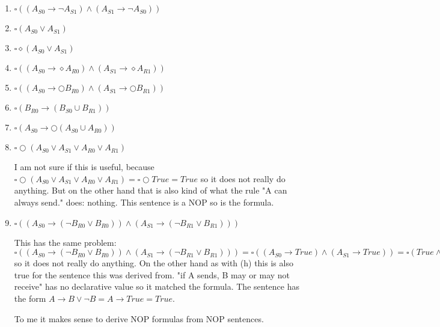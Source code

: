 \documentclass[12pt, a4paper]{article}
\begin{document}
\section{} %
\begin{enumerate}[a]
	\item %
	$\square ((A_{S0} \rightarrow \lnot A_{S1}) \land (A_{S1} \rightarrow \lnot A_{S0}))$
	\item %
	$\square (A_{S0} \lor A_{S1})$
	\item %
	$\square \diamond (A_{S0} \lor A_{S1})$
	\item %
	$\square ((A_{S0} \rightarrow \diamond A_{R0}) \land (A_{S1} \rightarrow \diamond A_{R1}))$
	\item %
	$\square ((A_{S0} \rightarrow \bigcirc B_{R0}) \land (A_{S1} \rightarrow \bigcirc B_{R1}))$
	\item %
	$\square (B_{R0} \rightarrow (B_{S0} \cup B_{R1}))$
	\item %
	$\square (A_{S0} \rightarrow \bigcirc (A_{S0} \cup A_{R0}))$
	\item %
	$\square \bigcirc (A_{S0} \lor A_{S1} \lor A_{R0} \lor A_{R1})$

	I am not sure if this is useful, because $\square \bigcirc (A_{S0} \lor A_{S1} \lor A_{R0} \lor A_{R1}) = \square \bigcirc True = True$ so it does not really do anything. But on the other hand that is also kind of what the rule "A can always send." does: nothing. This sentence is a NOP so is the formula.
	\item %
	$\square ((A_{S0} \rightarrow (\lnot B_{R0} \lor B_{R0})) \land (A_{S1} \rightarrow (\lnot B_{R1} \lor B_{R1})))$

	This has the same problem: $\square ((A_{S0} \rightarrow (\lnot B_{R0} \lor B_{R0})) \land (A_{S1} \rightarrow (\lnot B_{R1} \lor B_{R1}))) = \square ((A_{S0} \rightarrow True) \land (A_{S1} \rightarrow True)) = \square (True \land True) = \square True = True$ so it does not really do anything. On the other hand as with (h) this is also true for the sentence this was derived from. "if A sends, B may or may not receive" has no declarative value so it matched the formula. The sentence has the form $A \rightarrow B \lor \lnot B = A \rightarrow True = True$.

	To me it makes sense to derive NOP formulas from NOP sentences.
\end{enumerate}
\end{document}
